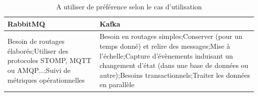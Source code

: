 \documentclass[11pt]{article}
\begin{document}
			\begin{table}
				\begin{tabular}{|p{7.5cm}|p{7.5cm}|}
				\hline
				\rowcolor{lightgray} RabbitMQ & Kafka\\\hline
				Besoin de routages élaborés;\newline Utiliser des protocoles STOMP, MQTT ou AMQP...;\newline Suivi de métriques opérationnelles & Besoin en routages simples;\newline Conserver (pour un temps donné) et relire des messages;\newline Mise à l’échelle;\newline Capture d’évènements induisant un changement d’état (dans une base de données ou autre);\newline Besoins transactionnels;\newline Traiter les données en parallèle\\\hline
				\end{tabular}
				\caption{A utiliser de préférence selon le cas d'utilisation}
				\label{tab:comparatifpref}
			\end{table}
		\newpage
\end{document}
